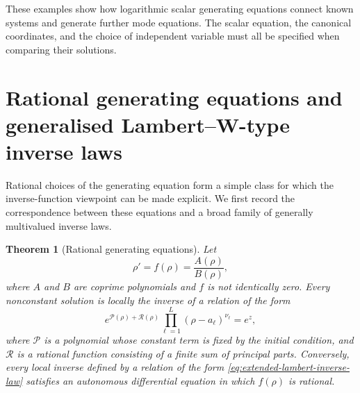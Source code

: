 \documentclass[11pt,a4paper]{article}
\numberwithin{equation}{section}
\newtheorem{theorem}{Theorem}[section]
\begin{document}
These examples show how logarithmic scalar generating equations connect known systems and generate further mode equations. The scalar equation, the canonical coordinates, and the choice of independent variable must all be specified when comparing their solutions.

\section{Rational generating equations and generalised Lambert--W-type inverse laws}
\label{sec:rational-generating-equations}

Rational choices of the generating equation form a simple class for which the inverse-function viewpoint can be made explicit.
We first record the correspondence between these equations and a broad family of generally multivalued inverse laws.

\begin{theorem}[Rational generating equations]
Let
\begin{equation}
    \rho'=f(\rho)=\frac{A(\rho)}{B(\rho)},
    \label{eq:rational-generating-ode}
\end{equation}
where $A$ and $B$ are coprime polynomials and $f$ is not identically zero.
Every nonconstant solution is locally the inverse of a relation of the form
\begin{equation}
    e^{\mathcal{P}(\rho)+\mathcal{R}(\rho)}
    \prod_{\ell=1}^{L}(\rho-a_\ell)^{\nu_\ell}
    =e^z,
    \label{eq:extended-lambert-inverse-law}
\end{equation}
where $\mathcal{P}$ is a polynomial whose constant term is fixed by the initial condition, and $\mathcal{R}$ is a rational function consisting of a finite sum of principal parts.
Conversely, every local inverse defined by a relation of the form \eqref{eq:extended-lambert-inverse-law} satisfies an autonomous differential equation in which $f(\rho)$ is rational.
\end{theorem}
\end{document}
